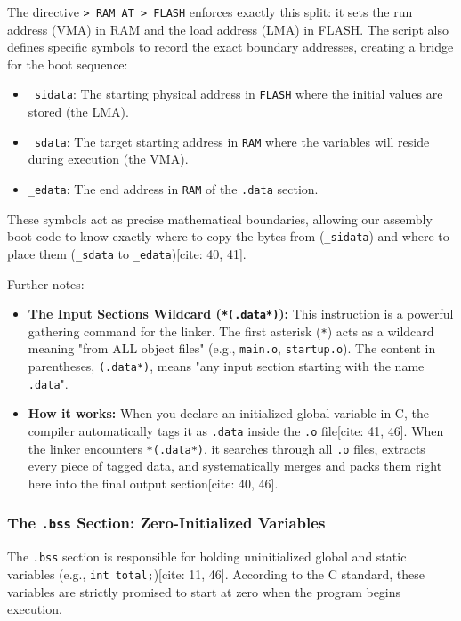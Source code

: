 The directive \texttt{> RAM AT > FLASH} enforces exactly this split: it sets the run address (VMA) in RAM and the load address (LMA) in FLASH. The script also defines specific symbols to record the exact boundary addresses, creating a bridge for the boot sequence:
\begin{itemize}
    \item \texttt{\_sidata}: The starting physical address in \texttt{FLASH} where the initial values are stored (the LMA).
    \item \texttt{\_sdata}: The target starting address in \texttt{RAM} where the variables will reside during execution (the VMA).
    \item \texttt{\_edata}: The end address in \texttt{RAM} of the \texttt{.data} section.
\end{itemize}
These symbols act as precise mathematical boundaries, allowing our assembly boot code to know exactly where to copy the bytes from (\texttt{\_sidata}) and where to place them (\texttt{\_sdata} to \texttt{\_edata})[cite: 40, 41].

Further notes:
\begin{itemize}
    \item \textbf{The Input Sections Wildcard (\texttt{*(.data*)}):} This instruction is a powerful gathering command for the linker. The first asterisk (\texttt{*}) acts as a wildcard meaning "from ALL object files" (e.g., \texttt{main.o}, \texttt{startup.o}). The content in parentheses, \texttt{(.data*)}, means "any input section starting with the name \texttt{.data}".
    \item \textbf{How it works:} When you declare an initialized global variable in C, the compiler automatically tags it as \texttt{.data} inside the \texttt{.o} file[cite: 41, 46]. When the linker encounters \texttt{*(.data*)}, it searches through all \texttt{.o} files, extracts every piece of tagged data, and systematically merges and packs them right here into the final output section[cite: 40, 46].
\end{itemize}

\subsubsection{The \texttt{.bss} Section: Zero-Initialized Variables}
The \texttt{.bss} section is responsible for holding uninitialized global and static variables (e.g., \texttt{int total;})[cite: 11, 46]. According to the C standard, these variables are strictly promised to start at zero when the program begins execution.

